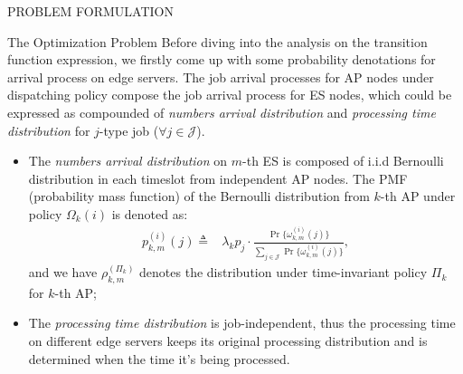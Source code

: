\documentclass[10pt, conference, letterpaper]{IEEEtran}
\newcommand{\define}{\triangleq}
\newcommand{\jSpace}{\mathcal{J}}
\begin{document}
\begin{section}{PROBLEM FORMULATION}
\begin{subsection}{The Optimization Problem}
            Before diving into the analysis on the transition function expression, we firstly come up with some probability denotations for arrival process on edge servers.
            The job arrival processes for AP nodes under dispatching policy compose the job arrival process for ES nodes, which could be expressed as compounded of \emph{numbers arrival distribution} and \emph{processing time distribution} for $j$-type job ($\forall j\in\jSpace$).
            \begin{itemize}
                \item The \emph{numbers arrival distribution} on $m$-th ES is composed of i.i.d Bernoulli distribution in each timeslot from independent AP nodes. The PMF (probability mass function) of the Bernoulli distribution from $k$-th AP under policy $\Omega_k(i)$ is denoted as:
                \begin{align}
                    p_{k,m}^{(i)}(j) \define& \lambda_k p_j \cdot
                        \frac{
                                \Pr\{\omega_{k,m}^{(i)}(j)\}
                            }{
                                \sum_{j\in\jSpace} \Pr\{\omega_{k,m}^{(i)}(j)\}
                            },
                \end{align}
                and we have $\rho_{k,m}^{(\Pi_k)}$ denotes the distribution under time-invariant policy $\Pi_k$ for $k$-th AP;
                \item The \emph{processing time distribution} is job-independent, thus the processing time on different edge servers keeps its original processing distribution and is determined when the time it's being processed.
            \end{itemize}
            

\end{subsection}
\end{section}
\end{document}
